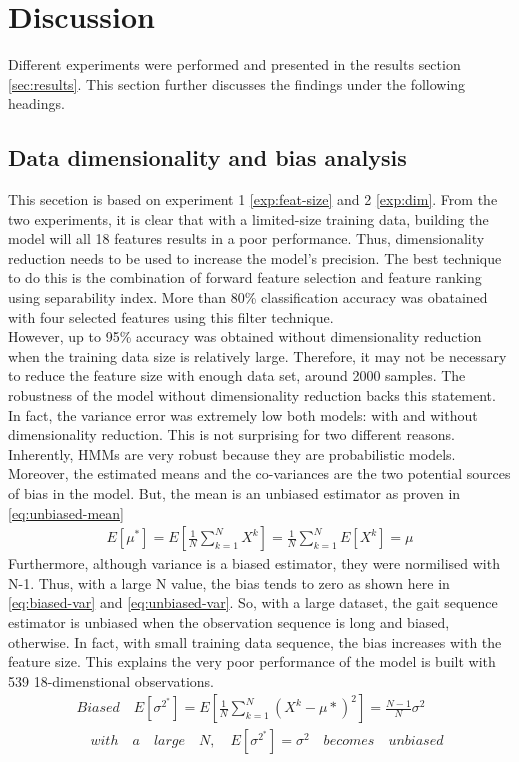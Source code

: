 \chapter{Discussion}

Different experiments were performed and presented in the results section \ref{sec:results}. This section further discusses the findings under the following headings.

\section{Data dimensionality and bias analysis}

This secetion is based on experiment 1 \ref{exp:feat-size} and 2 \ref{exp:dim}.
From the two experiments, it is clear that with a limited-size training data, building the model will all 18 features results in a poor performance. Thus, dimensionality reduction needs to be used to increase the model's precision. The best technique to do this is the combination of forward feature selection and feature ranking using separability index. More than 80\% classification accuracy was obatained with four selected features using this filter technique.\\
However, up to 95\% accuracy was obtained without dimensionality reduction when the training data size is relatively large. Therefore, it may not be necessary to reduce the feature size with enough data set, around 2000 samples. The robustness of the model without dimensionality reduction backs this statement. In fact, the variance error was extremely low both models: with and without dimensionality reduction. This is not surprising for two different reasons. Inherently, HMMs are very robust because they are probabilistic models. Moreover, the estimated means and the co-variances are the two potential sources of bias in the model. But, the mean is an unbiased estimator as proven in \ref{eq:unbiased-mean} 
\begin{align} 
	E[\mu^*] = E[\frac{1}{N}\sum_{k=1}^{N}X^k] = \frac{1}{N}\sum_{k=1}^{N}E[X^k]=\mu \label{eq:unbiased-mean}
\end{align} 
Furthermore, although variance is a biased estimator, they were normilised with N-1. Thus, with a large N value, the bias tends to zero as shown here in \ref{eq:biased-var} and \ref{eq:unbiased-var}. So, with a large dataset, the gait sequence estimator is unbiased when the observation sequence is long and biased, otherwise. In fact, with small training data sequence, the bias increases with the feature size. This explains the very poor performance of the model is built with 539 18-dimenstional observations.
 \begin{align} 
	Biased \quad	E[\sigma^{2^*}] = E[\frac{1}{N}\sum_{k=1}^{N}(X^k - \mu*)^2] = \frac{N - 1}{N}\sigma^2 \label{eq:biased-var}\\
 \quad with \quad a \quad large \quad N, \quad E[\sigma^{2^*}] = \sigma^2 \label{eq:unbiased-var} \quad becomes \quad unbiased
 \end{align}

